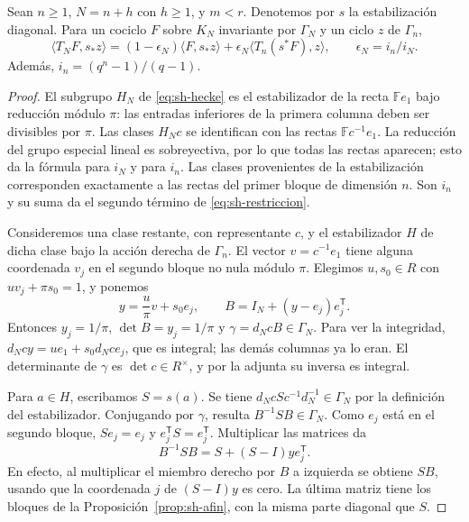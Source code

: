 \begin{proposicion}
\label{prop:sh-restriccion}
Sean $n\ge1$, $N=n+h$ con $h\ge1$, y $m<r$. Denotemos por $s$ la estabilización diagonal. Para un cociclo $F$ sobre $K_N$ invariante por $\Gamma_N$ y un ciclo $z$ de $\Gamma_n$,
\begin{equation}
 \langle T_N F,s_*z\rangle=(1-\epsilon_N)\langle F,s_*z\rangle
   +\epsilon_N\langle T_n(s^*F),z\rangle,
 \qquad \epsilon_N=i_n/i_N.
 \label{eq:sh-restriccion}
\end{equation}
Además, $i_n=(q^n-1)/(q-1)$.
\end{proposicion}
\begin{proof}
El subgrupo $H_N$ de \eqref{eq:sh-hecke} es el estabilizador de la recta $\mathbb F e_1$ bajo reducción módulo $\pi$: las entradas inferiores de la primera columna deben ser divisibles por $\pi$. Las clases $H_N c$ se identifican con las rectas $\mathbb F c^{-1}e_1$. La reducción del grupo especial lineal es sobreyectiva, por lo que todas las rectas aparecen; esto da la fórmula para $i_N$ y para $i_n$. Las clases provenientes de la estabilización corresponden exactamente a las rectas del primer bloque de dimensión $n$. Son $i_n$ y su suma da el segundo término de \eqref{eq:sh-restriccion}.

Consideremos una clase restante, con representante $c$, y el estabilizador $H$ de dicha clase bajo la acción derecha de $\Gamma_n$. El vector $v=c^{-1}e_1$ tiene alguna coordenada $v_j$ en el segundo bloque no nula módulo $\pi$. Elegimos $u,s_0\in R$ con $uv_j+\pi s_0=1$, y ponemos
\begin{equation}
 y=\frac{u}{\pi}v+s_0e_j,\qquad B=I_N+(y-e_j)e_j^{\mathsf T}.
 \label{eq:sh-afin-conjug}
\end{equation}
Entonces $y_j=1/\pi$, $\det B=y_j=1/\pi$ y $\gamma=d_NcB\in\Gamma_N$. Para ver la integridad, $d_Ncy=ue_1+s_0d_Nce_j$, que es integral; las demás columnas ya lo eran. El determinante de $\gamma$ es $\det c\in R^\times$, y por la adjunta su inversa es integral.

Para $a\in H$, escribamos $S=s(a)$. Se tiene $d_NcSc^{-1}d_N^{-1}\in\Gamma_N$ por la definición del estabilizador. Conjugando por $\gamma$, resulta $B^{-1}SB\in\Gamma_N$. Como $e_j$ está en el segundo bloque, $Se_j=e_j$ y $e_j^{\mathsf T}S=e_j^{\mathsf T}$. Multiplicar las matrices da
\begin{equation}
 B^{-1}SB=S+(S-I)y e_j^{\mathsf T}.
 \label{eq:sh-bloque-conjug}
\end{equation}
En efecto, al multiplicar el miembro derecho por $B$ a izquierda se obtiene $SB$, usando que la coordenada $j$ de $(S-I)y$ es cero. La última matriz tiene los bloques de la Proposición~\ref{prop:sh-afin}, con la misma parte diagonal que $S$.


\end{proof}

